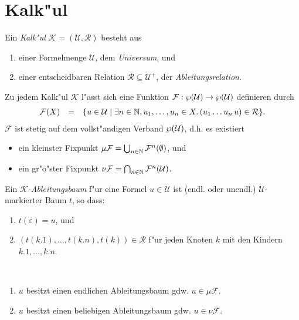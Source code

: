 \documentclass[12pt,a4paper]{article}
\begin{document}
\section{Kalk"ul}

\begin{definition}[Kalk"ul]
  Ein \emph{Kalk"ul} $\mathcal{K} = (\mathcal{U}, \mathcal{R})$ besteht aus
  \begin{enumerate}
  \item einer Formelmenge $\mathcal{U}$, dem \emph{Universum}, und
  \item einer entscheidbaren Relation $\mathcal{R} \subseteq \mathcal{U}^+$, der \emph{Ableitungsrelation}.
  \end{enumerate}
\end{definition}
Zu jedem Kalk"ul $\mathcal{K}$ l"asst sich eine Funktion
$\mathcal{F}:\wp(\mathcal{U}) \to \wp(\mathcal{U})$ definieren durch
\[\begin{array}{rcl}
\mathcal{F}(X) &=& \{u \in \mathcal{U} \mid \exists n\in\mathbb N,u_1,\ldots,u_n\in X.\,(u_1 \ldots u_n\,u) \in\mathcal{R}\}.
\end{array}\]
$\mathcal{F}$ ist stetig auf dem vollst"andigen Verband $\wp(\mathcal{U})$, d.h. es
existiert
\begin{itemize}
\item ein kleinster Fixpunkt $\mu\mathcal{F} = \bigcup_{n\in\mathbb N}\mathcal{F}^n(\emptyset)$, und
\item ein gr"o"ster Fixpunkt $\nu\mathcal{F} = \bigcap_{n\in\mathbb N}\mathcal{F}^n(\mathcal{U})$.
\end{itemize}
Ein \emph{$\mathcal{K}$-Ableitungsbaum} f"ur eine Formel $u \in \mathcal{U}$ ist (endl. oder unendl.)
$\mathcal{U}$-markierter Baum $t$, so dass:
\begin{enumerate}
\item $t(\varepsilon) = u$, und
\item $(t(k.1),\ldots,t(k.n),t(k)) \in \mathcal{R}$ f"ur jeden Knoten $k$ mit den Kindern $k.1,\ldots,k.n$.
\end{enumerate}

\begin{theorem} \
  \begin{enumerate}
  \item $u$ besitzt einen endlichen Ableitungsbaum gdw. $u \in \mu\mathcal{F}$.
  \item $u$ besitzt einen beliebigen Ableitungsbaum gdw. $u \in \nu\mathcal{F}$.
  \end{enumerate}
\end{theorem}
\end{document}
